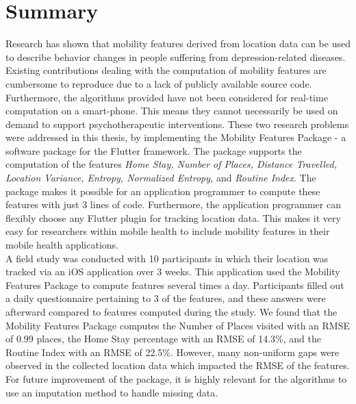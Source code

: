 \chapter{Summary}
Research has shown that mobility features derived from location data can be used to describe behavior changes in people suffering from depression-related diseases. Existing contributions dealing with the computation of mobility features are cumbersome to reproduce due to a lack of publicly available source code. Furthermore, the algorithms provided have not been considered for real-time computation on a smart-phone. This means they cannot necessarily be used on demand to support psychotherapeutic interventions. These two research problems were addressed in this thesis, by implementing the Mobility Features Package - a software package for the Flutter framework. The package supports the computation of the features \textit{Home Stay, Number of Places, Distance Travelled, Location Variance, Entropy, Normalized Entropy,} and \textit{Routine Index}. The package makes it possible for an application programmer to compute these features with just 3 lines of code. Furthermore, the application programmer can flexibly choose any Flutter plugin for tracking location data. This makes it very easy for researchers within mobile health to include mobility features in their mobile health applications.\\

A field study was conducted with 10 participants in which their location was tracked via an iOS application over 3 weeks. This application used the Mobility Features Package to compute features several times a day. Participants filled out a daily questionnaire pertaining to 3 of the features, and these answers were afterward compared to features computed during the study. We found that the Mobility Features Package computes the Number of Places visited with an RMSE of 0.99 places, the Home Stay percentage with an RMSE of 14.3\%, and the Routine Index with an RMSE of 22.5\%. However, many non-uniform gaps were observed in the collected location data which impacted the RMSE of the features. For future improvement of the package, it is highly relevant for the algorithms to use an imputation method to handle missing data.
